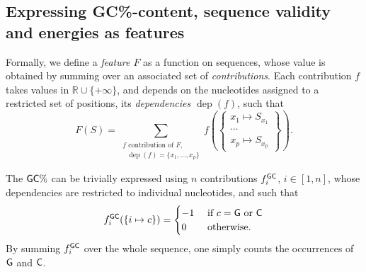\documentclass[]{bmcart}
\newcommand{\dep}{\operatorname{dep}}
\newcommand{\Def}[1]{\emph{#1}}
\newcommand{\Nuc}[1]{{\sf #1}}
\newcommand{\Cb}{\Nuc{C}}
\newcommand{\Gb}{\Nuc{G}}
\newcommand{\GCb}{\Gb\Cb}
\newcommand{\revised}[1]{{\color{red} #1}}
\begin{document}
\subsection*{Expressing \GCb\%-content, sequence validity and energies as features}
Formally, we define a \Def{feature $F$} as a function on sequences, whose value is obtained by summing over an associated set of \Def{contributions}. Each contribution $f$ takes values in $\mathbb{R}\cup \{+\infty\}$, and depends on the nucleotides assigned to a restricted set of positions, its \emph{dependencies $\dep(f)$}, such that
$$
F(S) =\!\!\!\!\!\!\!\sum_{\substack{\text{$f$ contribution of $F$,}\\\text{ $\dep(f)=\{x_1,\ldots,x_p\}$}}}\!\!\!\!\!\! f\left(\left\{\substack{x_1\mapsto S_{x_1}\\\cdots\\x_p\mapsto S_{x_p}}\right\}\right).
$$


The $\GCb\%$ can be trivially expressed using $n$ contributions $f^{\GCb}_i$, $i\in[1,n]$, whose dependencies are restricted to individual nucleotides,  and such that 
$$f^{\GCb}_i(\{i\mapsto c\})=\begin{cases}-1&\text{ if }c=\Gb\text{ or }\Cb\\ 0&\text{ otherwise}.\end{cases}$$ 
\revised{By summing $f^{\GCb}_i$ over the whole sequence, one simply counts the occurrences of $\Gb$ and $\Cb$.}
\end{document}
